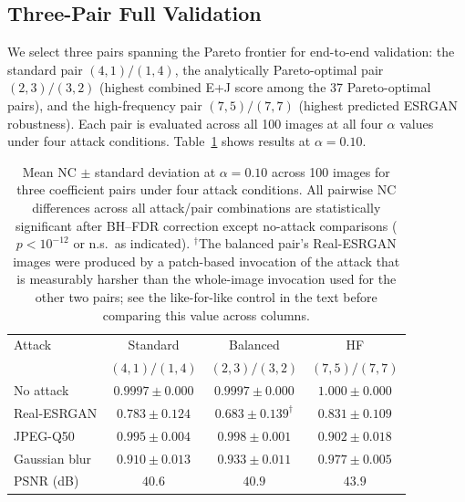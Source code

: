 \documentclass[conference]{IEEEtran}
\begin{document}
\subsection{Three-Pair Full Validation}

We select three pairs spanning the Pareto frontier for end-to-end
validation: the standard pair $(4,1)/(1,4)$, the analytically
Pareto-optimal pair $(2,3)/(3,2)$ (highest combined E+J score among the
37 Pareto-optimal pairs), and the high-frequency pair $(7,5)/(7,7)$
(highest predicted ESRGAN robustness). Each pair is evaluated across all
100 images at all four $\alpha$ values under four attack conditions.
Table~\ref{tab:pairs} shows results at $\alpha=0.10$.

\begin{table}[t]
\caption{Mean NC $\pm$ standard deviation at $\alpha=0.10$ across 100
images for three coefficient pairs under four attack conditions.
All pairwise NC differences across all attack/pair combinations are
statistically significant after BH--FDR correction except no-attack
comparisons ($p < 10^{-12}$ or n.s.\ as indicated). $^\dagger$The
balanced pair's Real-ESRGAN images were produced by a patch-based
invocation of the attack that is measurably harsher than the whole-image
invocation used for the other two pairs; see the like-for-like control
in the text before comparing this value across columns.}
\label{tab:pairs}
\centering
\begin{tabular}{lccc}
\toprule
Attack & Standard & Balanced & HF \\
       & $(4,1)/(1,4)$ & $(2,3)/(3,2)$ & $(7,5)/(7,7)$ \\
\midrule
No attack      & $0.9997 \pm 0.000$ & $0.9997 \pm 0.000$ & $1.000 \pm 0.000$ \\
Real-ESRGAN    & $0.783 \pm 0.124$ & $0.683 \pm 0.139^\dagger$   & $0.831 \pm 0.109$ \\
JPEG-Q50       & $0.995 \pm 0.004$ & $0.998 \pm 0.001$   & $0.902 \pm 0.018$ \\
Gaussian blur  & $0.910 \pm 0.013$ & $0.933 \pm 0.011$   & $0.977 \pm 0.005$ \\
\midrule
PSNR (dB)      & $40.6$ & $40.9$ & $43.9$ \\
\bottomrule
\end{tabular}
\end{table}
\end{document}
